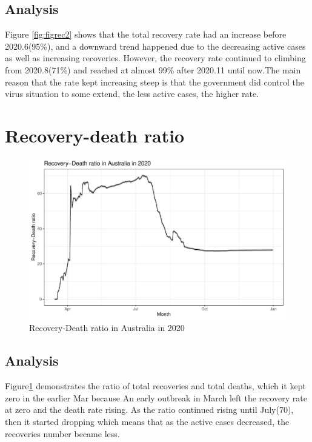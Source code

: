 \documentclass[11pt,a4paper,]{article}
\begin{document}
\hypertarget{analysis-4}{%
\subsection{Analysis}\label{analysis-4}}

Figure \ref{fig:figrec2} shows that the total recovery rate had an increase before 2020.6(95\%), and a downward trend happened due to the decreasing active cases as well as increasing recoveries. However, the recovery rate continued to climbing from 2020.8(71\%) and reached at almost 99\% after 2020.11 until now.The main reason that the rate kept increasing steep is that the government did control the virus situation to some extend, the less active cases, the higher rate.

\hypertarget{recovery-death-ratio}{%
\section{Recovery-death ratio}\label{recovery-death-ratio}}

\begin{figure}
\centering
\includegraphics{report_files/figure-latex/figrec3-1.pdf}
\caption{\label{fig:figrec3}Recovery-Death ratio in Australia in 2020}
\end{figure}

\hypertarget{analysis-5}{%
\subsection{Analysis}\label{analysis-5}}

Figure\ref{fig:figrec3} demonstrates the ratio of total recoveries and total deaths, which it kept zero in the earlier Mar because An early outbreak in March left the recovery rate at zero and the death rate rising. As the ratio continued rising until July(70), then it started dropping which means that as the active cases decreased, the recoveries number became less.
\end{document}
